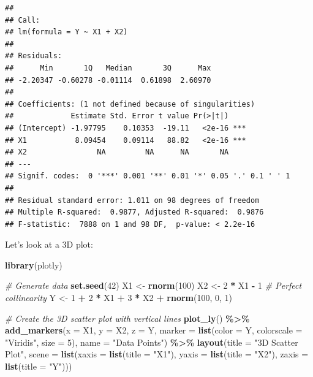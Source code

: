 \documentclass[
]{book}
\newenvironment{Shaded}{\begin{snugshade}}{\end{snugshade}}
\newcommand{\AttributeTok}[1]{\textcolor[rgb]{0.13,0.29,0.53}{#1}}
\newcommand{\CommentTok}[1]{\textcolor[rgb]{0.56,0.35,0.01}{\textit{#1}}}
\newcommand{\DecValTok}[1]{\textcolor[rgb]{0.00,0.00,0.81}{#1}}
\newcommand{\FunctionTok}[1]{\textcolor[rgb]{0.13,0.29,0.53}{\textbf{#1}}}
\newcommand{\NormalTok}[1]{#1}
\newcommand{\OtherTok}[1]{\textcolor[rgb]{0.56,0.35,0.01}{#1}}
\newcommand{\SpecialCharTok}[1]{\textcolor[rgb]{0.81,0.36,0.00}{\textbf{#1}}}
\newcommand{\StringTok}[1]{\textcolor[rgb]{0.31,0.60,0.02}{#1}}
\begin{document}
\begin{verbatim}
## 
## Call:
## lm(formula = Y ~ X1 + X2)
## 
## Residuals:
##      Min       1Q   Median       3Q      Max 
## -2.20347 -0.60278 -0.01114  0.61898  2.60970 
## 
## Coefficients: (1 not defined because of singularities)
##             Estimate Std. Error t value Pr(>|t|)    
## (Intercept) -1.97795    0.10353  -19.11   <2e-16 ***
## X1           8.09454    0.09114   88.82   <2e-16 ***
## X2                NA         NA      NA       NA    
## ---
## Signif. codes:  0 '***' 0.001 '**' 0.01 '*' 0.05 '.' 0.1 ' ' 1
## 
## Residual standard error: 1.011 on 98 degrees of freedom
## Multiple R-squared:  0.9877, Adjusted R-squared:  0.9876 
## F-statistic:  7888 on 1 and 98 DF,  p-value: < 2.2e-16
\end{verbatim}

Let's look at a 3D plot:

\begin{Shaded}
\begin{Highlighting}[]
\FunctionTok{library}\NormalTok{(plotly)}

\CommentTok{\# Generate data}
\FunctionTok{set.seed}\NormalTok{(}\DecValTok{42}\NormalTok{)}
\NormalTok{X1 }\OtherTok{\textless{}{-}} \FunctionTok{rnorm}\NormalTok{(}\DecValTok{100}\NormalTok{)}
\NormalTok{X2 }\OtherTok{\textless{}{-}} \DecValTok{2} \SpecialCharTok{*}\NormalTok{ X1 }\SpecialCharTok{{-}} \DecValTok{1}  \CommentTok{\# Perfect collinearity}
\NormalTok{Y  }\OtherTok{\textless{}{-}} \DecValTok{1} \SpecialCharTok{+} \DecValTok{2} \SpecialCharTok{*}\NormalTok{ X1 }\SpecialCharTok{+} \DecValTok{3} \SpecialCharTok{*}\NormalTok{ X2 }\SpecialCharTok{+} \FunctionTok{rnorm}\NormalTok{(}\DecValTok{100}\NormalTok{, }\DecValTok{0}\NormalTok{, }\DecValTok{1}\NormalTok{)}

\CommentTok{\# Create the 3D scatter plot with vertical lines}
\FunctionTok{plot\_ly}\NormalTok{() }\SpecialCharTok{\%\textgreater{}\%}
  \FunctionTok{add\_markers}\NormalTok{(}\AttributeTok{x =}\NormalTok{ X1, }\AttributeTok{y =}\NormalTok{ X2, }\AttributeTok{z =}\NormalTok{ Y, }
              \AttributeTok{marker =} \FunctionTok{list}\NormalTok{(}\AttributeTok{color =}\NormalTok{ Y, }\AttributeTok{colorscale =} \StringTok{"Viridis"}\NormalTok{, }\AttributeTok{size =} \DecValTok{5}\NormalTok{),}
              \AttributeTok{name =} \StringTok{"Data Points"}\NormalTok{) }\SpecialCharTok{\%\textgreater{}\%}
  \FunctionTok{layout}\NormalTok{(}\AttributeTok{title =} \StringTok{"3D Scatter Plot"}\NormalTok{,}
         \AttributeTok{scene =} \FunctionTok{list}\NormalTok{(}\AttributeTok{xaxis =} \FunctionTok{list}\NormalTok{(}\AttributeTok{title =} \StringTok{"X1"}\NormalTok{),}
                      \AttributeTok{yaxis =} \FunctionTok{list}\NormalTok{(}\AttributeTok{title =} \StringTok{"X2"}\NormalTok{),}
                      \AttributeTok{zaxis =} \FunctionTok{list}\NormalTok{(}\AttributeTok{title =} \StringTok{"Y"}\NormalTok{)))}
\end{Highlighting}
\end{Shaded}
\end{document}
